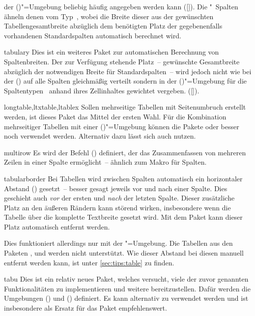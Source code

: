 \begin{packages}
  der ()"=Umgebung beliebig häufig 
  angegeben werden kann 
  ([]). 
  Die "~Spalten ähneln denen vom Typ~, 
  wobei die Breite dieser aus der gewünschten Tabellengesamtbreite abzüglich 
  dem benötigten Platz der gegebenenfalls vorhandenen Standardspalten 
  automatisch berechnet wird.
\item[tabulary]
  Dies ist ein weiteres Paket zur automatischen Berechnung von Spaltenbreiten. 
  Der zur Verfügung stehende Platz~-- gewünschte Gesamtbreite abzüglich der 
  notwendigen Breite für Standardspalten~-- wird jedoch nicht wie bei der 
  () auf alle Spalten gleichmäßig 
  verteilt sondern in der ()"=Umgebung 
  für die Spaltentypen~ anhand ihres Zellinhaltes gewichtet 
  vergeben. 
  ([]). 
\item[longtable,ltxtable,ltablex]
  Sollen mehrseitige Tabellen mit Seitenumbruch erstellt werden, ist dieses 
  Paket das Mittel der ersten Wahl. Für die Kombination mehrseitiger Tabellen 
  mit einer ()"=Umgebung können die 
  Pakete  oder besser noch  verwendet 
  werden. Alternativ dazu lässt sich auch  nutzen.
\item[multirow]
  Es wird der Befehl () definiert, der das 
  Zusammenfassen von mehreren Zeilen in einer Spalte ermöglicht~-- ähnlich zum 
  Makro  für Spalten.
\item[tabularborder]
  Bei Tabellen wird zwischen Spalten automatisch ein horizontaler Abstand 
  () gesetzt~-- besser gesagt jeweils vor und nach einer 
  Spalte. Dies geschieht auch \emph{vor} der ersten und \emph{nach} der letzten 
  Spalte. Dieser zusätzliche Platz an den äußeren Rändern kann störend wirken, 
  insbesondere wenn die Tabelle über die komplette Textbreite gesetzt wird. Mit 
  dem Paket  kann dieser Platz automatisch entfernt 
  werden.
  
  Dies funktioniert allerdings nur mit der "=Umgebung. 
  Die Tabellen aus den Paketen ,  und 
   werden nicht unterstützt. Wie dieser Abstand bei diesen 
  manuell entfernt werden kann, ist unter \autoref{sec:tips:table} zu finden.
\item[tabu]
  Dies ist ein relativ neues Paket, welches versucht, viele der zuvor genannten 
  Funktionalitäten zu implementieren und weitere bereitzustellen. Dafür werden 
  die Umgebungen () und 
  () definiert. Es kann alternativ zu 
   verwendet werden und ist insbesondere als Ersatz für das 
  Paket  empfehlenswert.
  

\end{packages}
